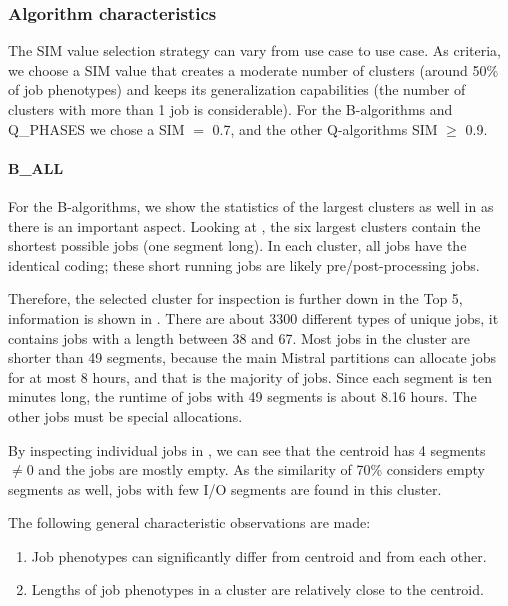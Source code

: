 \documentclass{jhps}
\begin{document}
\subsubsection{Algorithm characteristics}
The SIM value selection strategy can vary from use case to use case.
As criteria, we choose a SIM value that creates a moderate number of clusters (around 50\% of job phenotypes) and keeps its generalization capabilities (the number of clusters with more than 1 job is considerable).
For the B-algorithms and Q\_PHASES we chose a SIM $=$ 0.7, and the other Q-algorithms SIM $\geq$ 0.9.

\FloatBarrier
\paragraph{B\_ALL}
For the B-algorithms, we show the statistics of the largest clusters as well in  as there is an important aspect.
Looking at , the six largest clusters contain the shortest possible jobs (one segment long).
In each cluster, all jobs have the identical coding; these short running jobs are likely pre/post-processing jobs.

Therefore, the selected cluster for inspection is further down in the Top 5, information is shown in .
There are about 3300 different types of unique jobs, it contains jobs with a length between 38 and 67.
Most jobs in the cluster are shorter than 49 segments, because the main Mistral partitions can allocate jobs for at most 8 hours, and that is the majority of jobs.
Since each segment is ten minutes long, the runtime of jobs with 49 segments is about 8.16 hours.
The other jobs must be special allocations.

By inspecting individual jobs in , we can see that the centroid has 4 segments $\neq 0$ and the jobs are mostly empty.
As the similarity of 70\% considers empty segments as well, jobs with few I/O segments are found in this cluster.

The following general characteristic observations are made:
\begin{enumerate}
 \item Job phenotypes can significantly differ from centroid and from each other.
 \item Lengths of job phenotypes in a cluster are relatively close to the centroid.
\end{enumerate}
\end{document}
